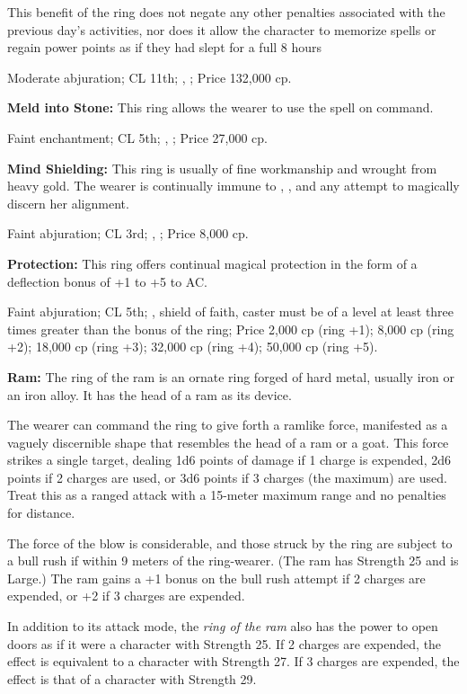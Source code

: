 This benefit of the ring does not negate any other penalties associated with the previous day's activities, nor does it allow the character to memorize spells or regain power points as if they had slept for a full 8 hours

Moderate abjuration; CL 11th; , ; Price 132,000 cp.

\textbf{Meld into Stone:} This ring allows the wearer to use the spell  on command.

Faint enchantment; CL 5th; , ; Price 27,000 cp.

\textbf{Mind Shielding:} This ring is usually of fine workmanship and wrought from heavy gold. The wearer is continually immune to , , and any attempt to magically discern her alignment.

Faint abjuration; CL 3rd; , ; Price 8,000 cp.

\textbf{Protection:} This ring offers continual magical protection in the form of a deflection bonus of +1 to +5 to AC.

Faint abjuration; CL 5th; , shield of faith, caster must be of a level at least three times greater than the bonus of the ring; Price 2,000 cp (ring +1); 8,000 cp (ring +2); 18,000 cp (ring +3); 32,000 cp (ring +4); 50,000 cp (ring +5).

\textbf{Ram:} The ring of the ram is an ornate ring forged of hard metal, usually iron or an iron alloy. It has the head of a ram as its device.

The wearer can command the ring to give forth a ramlike force, manifested as a vaguely discernible shape that resembles the head of a ram or a goat. This force strikes a single target, dealing 1d6 points of damage if 1 charge is expended, 2d6 points if 2 charges are used, or 3d6 points if 3 charges (the maximum) are used. Treat this as a ranged attack with a 15-meter maximum range and no penalties for distance.

The force of the blow is considerable, and those struck by the ring are subject to a bull rush if within 9 meters of the ring-wearer. (The ram has Strength 25 and is Large.) The ram gains a +1 bonus on the bull rush attempt if 2 charges are expended, or +2 if 3 charges are expended.

In addition to its attack mode, the \emph{ring of the ram} also has the power to open doors as if it were a character with Strength 25. If 2 charges are expended, the effect is equivalent to a character with Strength 27. If 3 charges are expended, the effect is that of a character with Strength 29.

